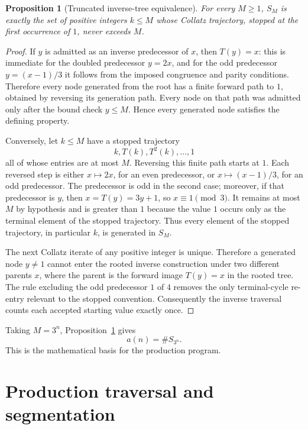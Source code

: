 \documentclass[11pt]{article}
\newtheorem{proposition}[theorem]{Proposition}
\theoremstyle{definition}
\theoremstyle{remark}
\begin{document}
\begin{proposition}[Truncated inverse-tree equivalence]
\label{prop:inverse-tree}
For every \(M\geq 1\), \(S_M\) is exactly the set of positive integers
\(k\leq M\) whose Collatz trajectory, stopped at the first occurrence of \(1\),
never exceeds \(M\).
\end{proposition}

\begin{proof}
If \(y\) is admitted as an inverse predecessor of \(x\), then \(T(y)=x\):
this is immediate for the doubled predecessor \(y=2x\), and for the odd
predecessor \(y=(x-1)/3\) it follows from the imposed congruence and parity
conditions.  Therefore every node generated from the root has a finite forward
path to \(1\), obtained by reversing its generation path.  Every node on that
path was admitted only after the bound check \(y\leq M\).  Hence every
generated node satisfies the defining property.

Conversely, let \(k\leq M\) have a stopped trajectory
\[
k, T(k), T^2(k),\ldots,1
\]
all of whose entries are at most \(M\).  Reversing this finite path starts at
\(1\).  Each reversed step is either \(x\mapsto 2x\), for an even predecessor,
or \(x\mapsto (x-1)/3\), for an odd predecessor.  The predecessor is odd in the
second case; moreover, if that predecessor is \(y\), then \(x=T(y)=3y+1\), so
\(x\equiv 1\pmod 3\).  It remains at most \(M\) by hypothesis and is greater
than \(1\) because the value \(1\) occurs only as the terminal element of the
stopped trajectory.  Thus every element of the stopped trajectory, in
particular \(k\), is generated in \(S_M\).

The next Collatz iterate of any positive integer is unique.  Therefore a
generated node \(y\neq 1\) cannot enter the rooted inverse construction under
two different parents \(x\), where the parent is the forward image \(T(y)=x\)
in the rooted tree.  The rule excluding the odd predecessor \(1\) of \(4\)
removes the only terminal-cycle re-entry relevant to the stopped convention.
Consequently the inverse traversal counts each accepted starting value exactly
once.
\end{proof}

Taking \(M=3^n\), Proposition~\ref{prop:inverse-tree} gives
\[
a(n)=\#S_{3^n}.
\]
This is the mathematical basis for the production program.

\section{Production traversal and segmentation}
\end{document}
